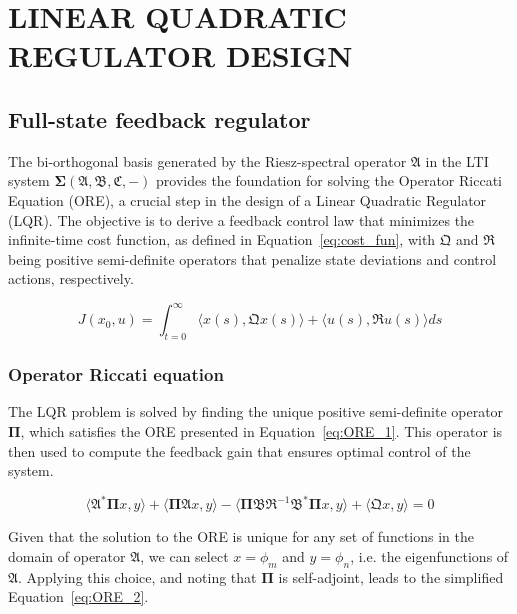 \section{LINEAR QUADRATIC REGULATOR DESIGN}

\subsection{Full-state feedback regulator}

The bi-orthogonal basis generated by the Riesz-spectral operator $\mathfrak{A}$ in the LTI system $\mathbf{\Sigma(\mathfrak{A},\mathfrak{B},\mathfrak{C},-)}$ provides the foundation for solving the Operator Riccati Equation (ORE), a crucial step in the design of a Linear Quadratic Regulator (LQR). The objective is to derive a feedback control law that minimizes the infinite-time cost function, as defined in Equation~\ref{eq:cost_fun}, with $\mathfrak{Q}$ and $\mathfrak{R}$ being positive semi-definite operators that penalize state deviations and control actions, respectively.

\begin{equation} \label{eq:cost_fun}
    J(x_0, u) = \int_{t=0}^{\infty} \langle x(s), \mathfrak{Q} x(s)\rangle + \langle u(s), \mathfrak{R} u(s)\rangle ds
\end{equation}

\subsubsection{Operator Riccati equation}

The LQR problem is solved by finding the unique positive semi-definite operator $\mathbf{\Pi}$, which satisfies the ORE presented in Equation~\ref{eq:ORE_1}. This operator is then used to compute the feedback gain that ensures optimal control of the system.

\begin{equation} \label{eq:ORE_1}
    \langle \mathfrak{A}^* \mathbf{\Pi} x, y\rangle + \langle \mathbf{\Pi} \mathfrak{A} x, y \rangle - \langle \mathbf{\Pi} \mathfrak{B} \mathfrak{R}^{-1} \mathfrak{B}^* \mathbf{\Pi} x, y\rangle + \langle \mathfrak{Q} x, y\rangle = 0
\end{equation}

Given that the solution to the ORE is unique for any set of functions in the domain of operator $\mathfrak{A}$, we can select $x = \phi_m$ and $y = \phi_n$, i.e. the eigenfunctions of $\mathfrak{A}$. Applying this choice, and noting that $\mathbf{\Pi}$ is self-adjoint, leads to the simplified Equation~\ref{eq:ORE_2}.

